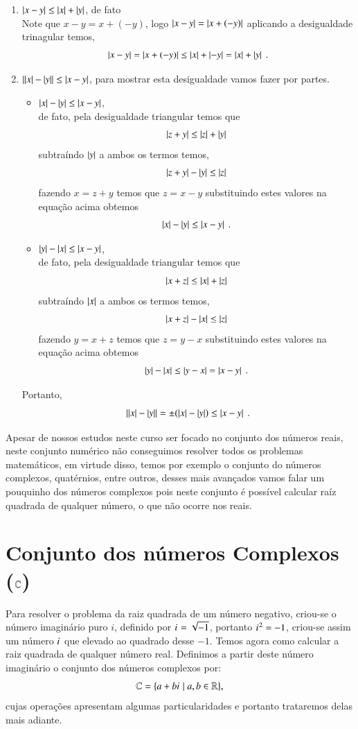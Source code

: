 \begin{prop}
\begin{enumerate}
 \item $\left|x-y\right| \leq \left|x\right| + \left|y\right|$, de fato \\
 Note que $x-y= x+ (-y)$, logo $\left|x-y\right|= \left|x+ (-y)\right|$ aplicando a desigualdade trinagular temos,
 \[\left|x-y\right|= \left|x+ (-y)\right| \leq \left|x\right| + \left|-y\right|= \left|x\right| + \left|y\right| \ .\]

 \item $\left|\left|x\right| - \left|y\right|\right| \leq \left|x - y\right|$, para mostrar esta desigualdade vamos fazer por partes.
 \begin{itemize}
 \item $\left|x\right| - \left|y\right| \leq \left|x - y\right|$, \\
 de fato, pela desigualdade triangular temos que
 \[\left|z+y\right| \leq \left|z\right| + \left|y\right|\]
 subtraíndo $\left|y\right|$ a ambos os termos temos,
 \[\left|z+y\right| - \left|y\right| \leq \left|z\right|\]
 fazendo $x= z+y$ temos que $z=x-y$ substituindo estes valores na equação acima obtemos
 \[\abs{x} - \abs{y} \leq \abs{x-y} \ . \]
 \item $\left|y\right| - \left|x\right| \leq \left|x - y\right|$, \\
 de fato, pela desigualdade triangular temos que
 \[\left|x+z\right| \leq \left|x\right| + \left|z\right|\]
 subtraíndo $\left|x\right|$ a ambos os termos temos,
 \[\left|x+z\right| - \left|x\right| \leq \left|z\right|\]
 fazendo $y= x+z$ temos que $z=y-x$ substituindo estes valores na equação acima obtemos
 \[\abs{y} - \abs{x} \leq \abs{y-x}= \abs{x-y} \ . \]
 \end{itemize}

 Portanto,
 \[ \left|\left|x\right| - \left|y\right|\right| = \pm (\left|x\right| - \left|y\right|) \leq \left|x-y\right| \ .\]

\end{enumerate}
\end{prop}




Apesar de nossos estudos neste curso ser focado no conjunto dos números reais, neste conjunto numérico não conseguimos resolver todos os problemas matemáticos, em virtude disso, temos por exemplo o conjunto do números complexos, quatérnios, entre outros, desses mais avançados vamos falar um pouquinho dos números complexos pois neste conjunto é possível calcular raíz quadrada de qualquer número, o que não ocorre nos reais.

\section{Conjunto dos números Complexos (\texorpdfstring{$\mathbb{C}$}{C})}

Para resolver o problema da raiz quadrada de um número negativo, criou-se o número imaginário puro $i$, definido por ${i\mkern1mu}= \sqrt{-1}$, portanto ${i\mkern1mu}^2= -1$, criou-se assim um número ${i\mkern1mu}$ que elevado ao quadrado desse $-1$. Temos agora como calcular a raiz quadrada de qualquer número real. Definimos a partir deste número imaginário o conjunto dos números complexos por:
\[\mathbb{C}= \{a + b{i\mkern1mu} \mid a, b \in \mathbb{R} \} ,\]
cujas operações apresentam algumas particularidades e portanto trataremos delas mais adiante.

